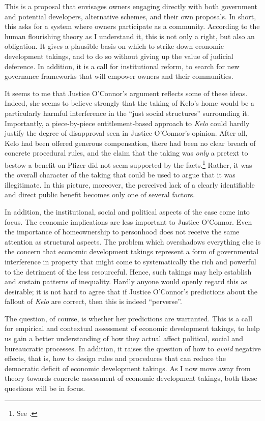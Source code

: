 This is a proposal that envisages owners engaging directly with both government and potential developers,  alternative schemes, and  their own proposals. In short, this asks for a system where owners participate as a community. According to the human flourishing theory as I understand it, this is not only a right, but also an obligation. It gives a plausible basis on which to strike down economic development takings, and to do so without giving up the value of judicial deference. In addition, it is a call for institutional reform, to search for new governance frameworks that will empower owners and their communities.

It seems to me that Justice O'Connor's argument reflects some of these ideas. Indeed, she seems to believe strongly that the taking of Kelo's home would be a particularly harmful interference in the ``just social structures'' surrounding it. Importantly, a piece-by-piece entitlement-based approach to {\it Kelo} could hardly justify the degree of disapproval seen in Justice O'Connor's opinion. After all, Kelo had been offered generous compensation, there had been no clear breach of concrete procedural rules, and the claim that the taking was {\it only} a pretext to bestow a benefit on Pfizer did not seem supported by the facts.\footnote{See \cite{bell06}.} Rather, it was the overall character of the taking that could be used to argue that it was illegitimate. In this picture, moreover, the perceived lack of a clearly identifiable and direct public benefit becomes only one of several factors.

In addition, the institutional, social and political aspects of the case come into focus. The economic implications are less important to Justice O'Connor. Even the importance of homeownership to personhood does not receive the same attention as structural aspects. The problem which overshadows everything else is the concern that economic development takings represent a form of governmental interference in property that might come to systematically  the rich and powerful to the detriment of the less resourceful. Hence, such takings may help establish and sustain patterns of inequality. Hardly anyone would openly regard this as desirable; it is not hard to agree that if Justice O'Connor's predictions about the fallout of {\it Kelo} are correct, then this is indeed  ``perverse''. 

The question, of course, is whether her predictions are warranted. This is a call for empirical and contextual assessment of economic development takings, to help us gain a better understanding of how they actual affect political, social and bureaucratic processes. In addition, it raises the question of how to {\it avoid} negative effects, that is, how to design rules and procedures that can reduce the democratic deficit of economic development takings. As I now move away from theory towards concrete assessment of economic development takings, both these questions will be in focus.

